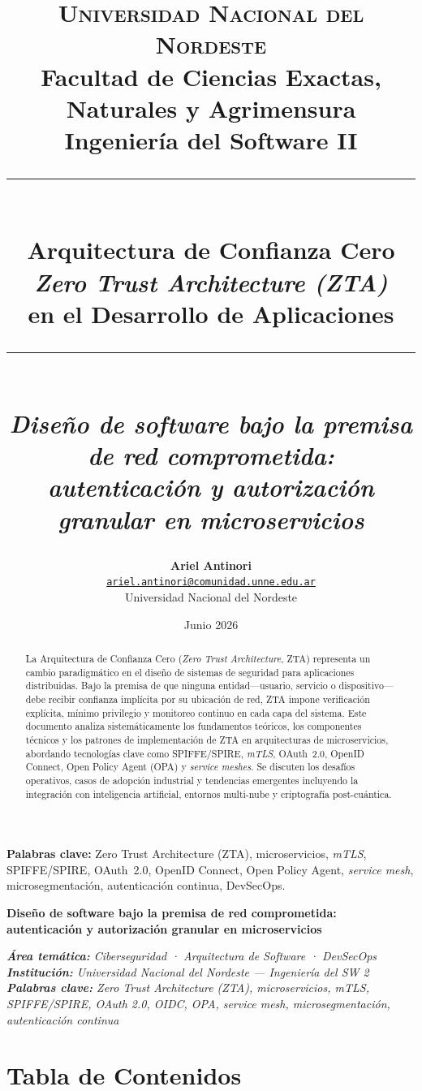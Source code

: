 \documentclass[12pt,a4paper]{article}
\title{%
  \vspace{-0.5cm}
  {\large\textsc{Universidad Nacional del Nordeste}}\\[0.2em]
  {\normalsize Facultad de Ciencias Exactas, Naturales y Agrimensura}\\
  {\normalsize Ingeniería del Software II}\\[1.5em]
  \rule{\linewidth}{1pt}\\[0.7em]
  {\LARGE\bfseries\color{NavyBlue} Arquitectura de Confianza Cero}\\[0.3em]
  {\Large\textit{Zero Trust Architecture (ZTA)}}\\[0.3em]
  {\large en el Desarrollo de Aplicaciones}\\[0.5em]
  \rule{\linewidth}{1pt}\\[0.5em]
  {\small\textit{Diseño de software bajo la premisa de red comprometida:\\
  autenticación y autorización granular en microservicios}}%
}
\author{%
  \textbf{Ariel Antinori}\\[0.4em]
  \href{mailto:ariel.antinori@comunidad.unne.edu.ar}%
       {\texttt{ariel.antinori@comunidad.unne.edu.ar}}\\[0.3em]
  Universidad Nacional del Nordeste%
}
\date{Junio 2026}
\begin{document}
\maketitle
\thispagestyle{empty}

\begin{abstract}
La Arquitectura de Confianza Cero (\textit{Zero Trust Architecture}, ZTA) representa
un cambio paradigmático en el diseño de sistemas de seguridad para aplicaciones distribuidas. Bajo la
premisa de que ninguna entidad---usuario, servicio o dispositivo---debe recibir confianza implícita por
su ubicación de red, ZTA impone verificación explícita, mínimo privilegio y monitoreo continuo en cada
capa del sistema. Este documento analiza sistemáticamente los fundamentos teóricos, los componentes
técnicos y los patrones de implementación de ZTA en arquitecturas de microservicios, abordando
tecnologías clave como SPIFFE/SPIRE, \textit{mTLS}, OAuth~2.0, OpenID Connect, Open Policy Agent (OPA)
y \textit{service meshes}. Se discuten los desafíos operativos, casos de adopción industrial y tendencias
emergentes incluyendo la integración con inteligencia artificial, entornos multi-nube y criptografía
post-cuántica.
\end{abstract}

\noindent\textbf{Palabras clave:} Zero Trust Architecture (ZTA), microservicios,
\textit{mTLS}, SPIFFE/SPIRE, OAuth~2.0, OpenID Connect, Open Policy Agent, \textit{service mesh},
microsegmentación, autenticación continua, DevSecOps.

\vspace{1em}
\tableofcontents
\newpage


\textbf{Diseño de software bajo la premisa de red comprometida: autenticación y autorización granular en microservicios}



\begin{mdframed}[style=quoteStyle]
\textit{\textbf{Área temática:} Ciberseguridad · Arquitectura de Software · DevSecOps}
\textit{\textbf{Institución:} Universidad Nacional del Nordeste — Ingeniería del SW 2}
\textit{\textbf{Palabras clave:} Zero Trust Architecture (ZTA), microservicios, mTLS, SPIFFE/SPIRE, OAuth 2.0, OIDC, OPA, service mesh, microsegmentación, autenticación continua}
\end{mdframed}



\section{Tabla de Contenidos}
\end{document}
